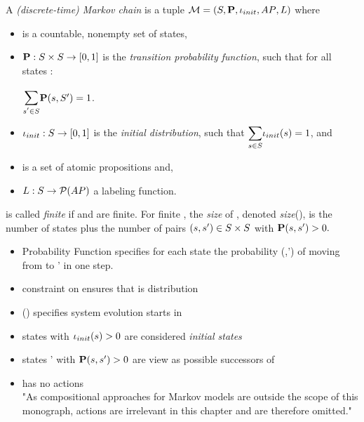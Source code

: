 \documentclass[preview]{standalone}
\begin{document}

\begin{definition}
	A \emph{(discrete-time) Markov chain} is a tuple ${\mathcal{M}} = ({S}, {\textbf{P}}, {\iota_{init}}, {AP}, {L})$ where 
	\begin{itemize}
		\item \states is a countable, nonempty set of states,
		\item ${\textbf{P}} : {S} \times {S} \to [0,1]$ is the \emph{transition probability function}, such that for all states \state:
		\begin{center}
			$\bbigsum{\state' \in \states}\probtfunc(\state,\states') = 1$.	
		\end{center}
		\item ${\iota_{init}} : {S} \to [0,1]$ is the \emph{initial distribution}, such that $\mathlarger{\sum_{\state \in \states}} \initdistrib(\state) = 1$, and
		\item \atomicprops is a set of atomic propositions and,
		\item ${L} : {S} \to {\mathcal{P}(\ensuremath{{AP}})}$ a labeling function.		
	\end{itemize}

	\autm is called \emph{finite} if \states and \atomicprops are finite. For finite \autm, the \emph{size} of \autm, denoted \emph{size}(\autm),  is the number of states plus the number of pairs $({s}, {s}') \in {S} \times {S}$ with ${\textbf{P}}({s}, {s}') > 0.$
\end{definition}

\begin{itemize}
	\item Probability Function \probtfunc specifies for each state \state the probability \probtfunc(\state,\state') of moving from \state to \state' in one step.
	\item constraint on \probtfunc ensures that \probtfunc is distribution
	\item \initdistrib(\state) specifies system evolution starts in \state
	\item states \state with ${\iota_{init}}({s}) > 0$ are  considered \emph{initial states}
	\item states \state' with ${\textbf{P}}({s}, {s}') > 0$ are view as possible successors of \state
	\item has no actions \\ "As compositional approaches for Markov models are outside the scope of this monograph,
	actions are irrelevant in this chapter and are therefore omitted."
\end{itemize}
\end{document}
